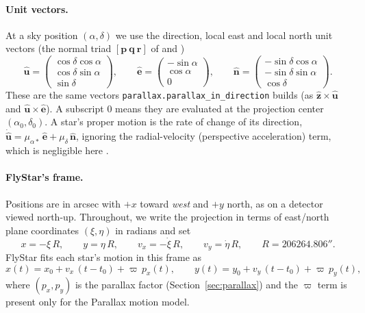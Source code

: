 \documentclass[11pt]{article}
\newcommand{\code}[1]{\texttt{#1}}
\newcommand{\uvec}[1]{\hat{\mathbf #1}}
\begin{document}
\paragraph{Unit vectors.} At a sky position $(\alpha,\delta)$ we use the
direction, local east and local north unit vectors (the normal triad
$[\mathbf p\ \mathbf q\ \mathbf r]$ of \citealt{ESA1997} and \citealt{Lindegren2012})
\begin{equation}
  \uvec u = \begin{pmatrix}\cos\delta\cos\alpha\\ \cos\delta\sin\alpha\\ \sin\delta\end{pmatrix},\qquad
  \uvec e = \begin{pmatrix}-\sin\alpha\\ \cos\alpha\\ 0\end{pmatrix},\qquad
  \uvec n = \begin{pmatrix}-\sin\delta\cos\alpha\\ -\sin\delta\sin\alpha\\ \cos\delta\end{pmatrix}.
  \label{eq:triad}
\end{equation}
These are the same vectors \code{parallax.parallax\_in\_direction} builds (as
$\uvec z\times\uvec u$ and $\uvec u\times\uvec e$). A subscript 0 means they
are evaluated at the projection center $(\alpha_0,\delta_0)$. A star's proper
motion is the rate of change of its direction,
$\dot{\uvec u} = \mu_{\alpha*}\,\uvec e + \mu_\delta\,\uvec n$, ignoring the
radial-velocity (perspective acceleration) term, which is negligible here
\citep{Butkevich2014}.

\paragraph{FlyStar's frame.} Positions are in arcsec with $+x$ toward
\emph{west} and $+y$ north, as on a detector viewed north-up. Throughout, we
write the projection in terms of east/north plane coordinates $(\xi,\eta)$ in
radians and set
\begin{equation}
  x = -\xi\,R, \qquad y = \eta\,R, \qquad
  v_x = -\dot\xi\,R, \qquad v_y = \dot\eta\,R, \qquad R = 206264.806''.
  \label{eq:xy}
\end{equation}
FlyStar fits each star's motion in this frame as
\begin{equation}
  x(t) = x_0 + v_x\,(t-t_0) + \varpi\,p_x(t), \qquad
  y(t) = y_0 + v_y\,(t-t_0) + \varpi\,p_y(t),
  \label{eq:model}
\end{equation}
where $(p_x, p_y)$ is the parallax factor (Section~\ref{sec:parallax}) and the
$\varpi$ term is present only for the Parallax motion model.
\end{document}
